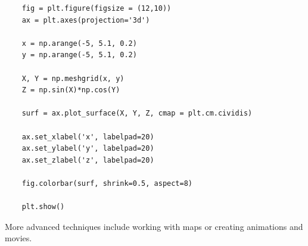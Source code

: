 \documentclass{article}
\begin{document}
\begin{verbatim}
    fig = plt.figure(figsize = (12,10))
    ax = plt.axes(projection='3d')
    
    x = np.arange(-5, 5.1, 0.2)
    y = np.arange(-5, 5.1, 0.2)
    
    X, Y = np.meshgrid(x, y)
    Z = np.sin(X)*np.cos(Y)
    
    surf = ax.plot_surface(X, Y, Z, cmap = plt.cm.cividis)

    ax.set_xlabel('x', labelpad=20)
    ax.set_ylabel('y', labelpad=20)
    ax.set_zlabel('z', labelpad=20)
    
    fig.colorbar(surf, shrink=0.5, aspect=8)
    
    plt.show()
\end{verbatim}


More advanced techniques include working with maps or creating animations and movies.
\end{document}
